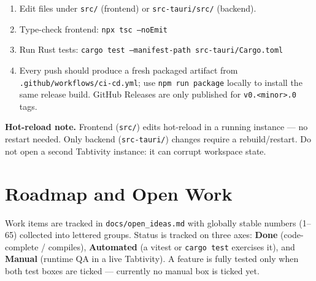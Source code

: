 \documentclass[11pt,a4paper]{article}
\newcommand{\done}{\textcolor{donegreen}{\textbf{Done}}}
\newcommand{\code}[1]{\texttt{#1}}
\begin{document}
\begin{enumerate}
  \item Edit files under \code{src/} (frontend) or \code{src-tauri/src/}
  (backend).
  \item Type-check frontend: \code{npx tsc --noEmit}
  \item Run Rust tests: \code{cargo test --manifest-path src-tauri/Cargo.toml}
  \item Every push should produce a fresh packaged artifact from
  \code{.github/workflows/ci-cd.yml}; use \code{npm run package} locally to
  install the same release build. GitHub Releases are only published for
  \code{v0.<minor>.0} tags.
\end{enumerate}

\noindent\textbf{Hot-reload note.} Frontend (\code{src/}) edits hot-reload in a
running instance --- no restart needed. Only backend (\code{src-tauri/}) changes
require a rebuild/restart. Do not open a second Tabtivity instance: it can corrupt
workspace state.

\section{Roadmap and Open Work}

Work items are tracked in \code{docs/open\_ideas.md} with globally stable
numbers (1--65) collected into lettered groups. Status is tracked on three axes:
\done{} (code-complete / compiles), \textbf{Automated} (a vitest or
\code{cargo test} exercises it), and \textbf{Manual} (runtime QA in a live
Tabtivity). A feature is fully tested only when both test boxes are ticked ---
currently no manual box is ticked yet.
\end{document}
